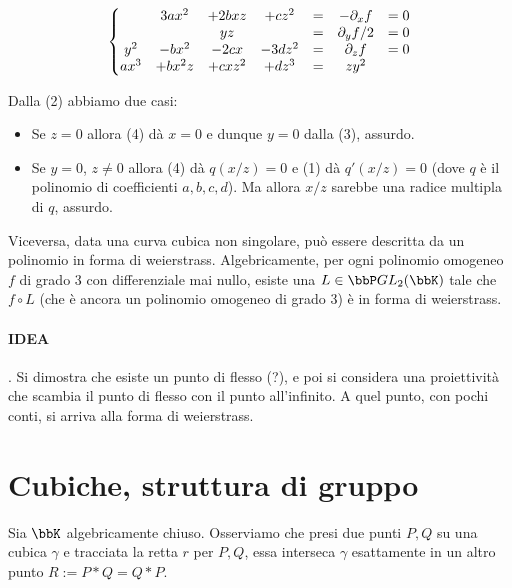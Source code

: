 
$$ \left\{ 
\begin{matrix}
&3ax^2&+2bxz&+cz^2 & = & -\partial_{x}f & = 0 \\
&&yz& & = & \partial_{y}f / 2 &= 0 \\
y^2 &-bx^2&-2cx&-3dz^2 & = & \partial_{z}f& = 0 \\
ax^3&+bx^2z&+cxz^2&+dz^3& = & zy^2&
\end{matrix}
\right.$$

Dalla (2) abbiamo due casi:

\begin{itemize}
	\item Se $z=0$ allora (4) dà $x=0$ e dunque $y=0$ dalla (3), assurdo.

	\item Se $y = 0$, $z \neq 0$ allora (4) dà $q(x/z) = 0$ e (1) dà $q'(x/z) = 0$ (dove $q$ è il polinomio di coefficienti $a,b,c,d$). Ma allora $x/z$ sarebbe una radice multipla di $q$, assurdo.  
\end{itemize}

Viceversa, data una curva cubica non singolare, può essere descritta da un polinomio in forma di weierstrass. Algebricamente, per ogni polinomio omogeneo $f$ di grado 3 con differenziale mai nullo, esiste una $L \in \bbP GL_2(\bbK) $ tale che $f \circ L$ (che è ancora un polinomio omogeneo di grado 3) è in forma di weierstrass. 
\paragraph{IDEA}. Si dimostra che esiste un punto di flesso (?), e poi si considera una proiettività che scambia il  punto di flesso con il punto all'infinito. A quel punto, con pochi conti, si arriva alla forma di weierstrass.

\section{Cubiche, struttura di gruppo}

Sia $\bbK$ algebricamente chiuso. Osserviamo che presi due punti $P,Q$ su una cubica $\gamma$ e tracciata la retta $r$ per $P,Q$, essa interseca $\gamma$ esattamente in un altro punto $R:=P * Q = Q*P$. 

